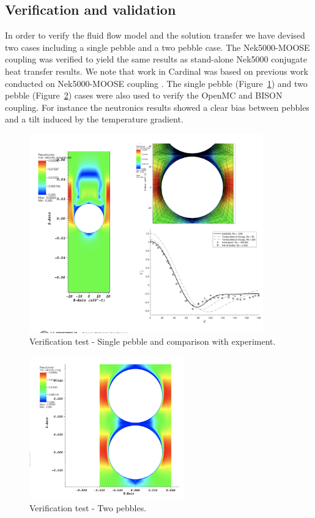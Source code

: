 \subsection{Verification and validation}
\label{ss:c3}

In order to verify the fluid flow model and the solution transfer we have devised two cases including a single pebble and a two pebble case. The Nek5000-MOOSE coupling was verified to yield the same results as stand-alone Nek5000 conjugate heat transfer results. We note that work in Cardinal was based on previous work conducted on Nek5000-MOOSE coupling \cite{novak2018preliminary}. The single pebble (Figure~\ref{f:pb1}) and two pebble (Figure~\ref{f:pb2}) cases were also used to verify the OpenMC and BISON coupling. For instance the neutronics results showed a clear bias between pebbles and a tilt induced by the temperature gradient.

\begin{figure}[!h]
\centering
\includegraphics[clip=true,width=0.9\textwidth]{Figures/pb_vv1}
\caption{Verification test - Single pebble and comparison with experiment.}
\label{f:pb1}
\end{figure}

\begin{figure}[!h]
\centering
\includegraphics[clip=true,width=0.6\textwidth]{Figures/pb_vv2}
\caption{Verification test - Two pebbles.}
\label{f:pb2}
\end{figure}

